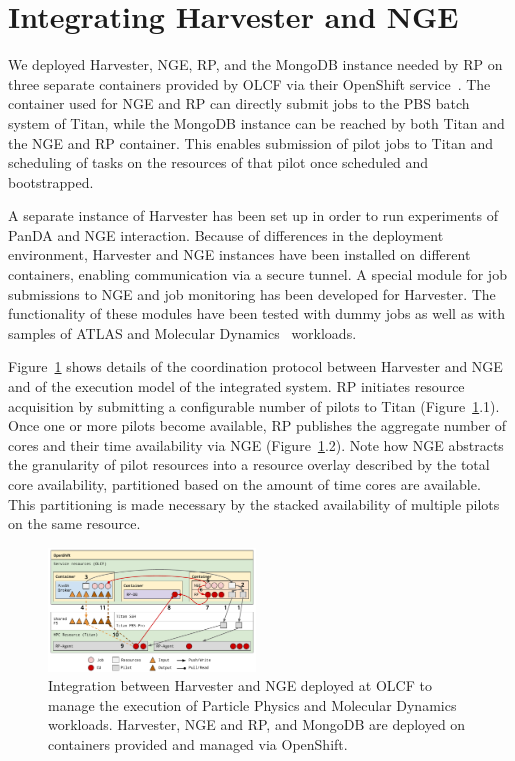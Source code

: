 \documentclass{webofc}
\begin{document}
\section{Integrating Harvester and NGE}\label{sec:integration}

We deployed Harvester, NGE, RP, and the MongoDB instance needed by RP on
three separate containers provided by OLCF via their OpenShift
service~\cite{openshift}. The container used for NGE and RP can directly
submit jobs to the PBS batch system of Titan, while the MongoDB instance can
be reached by both Titan and the NGE and RP container. This enables
submission of pilot jobs to Titan and scheduling of tasks on the resources of
that pilot once scheduled and bootstrapped.

A separate instance of Harvester has been set up in order to run experiments
of PanDA and NGE interaction. Because of differences in the deployment
environment, Harvester and NGE instances have been installed on different
containers, enabling communication via a secure tunnel. A special module for
job submissions to NGE and job monitoring has been developed for Harvester.
The functionality of these modules have been tested with dummy jobs as well
as with samples of ATLAS and Molecular Dynamics~\cite{Brooks2009CHARMMTB}
workloads.

Figure~\ref{fig:integration} shows details of the coordination protocol
between Harvester and NGE and of the execution model of the integrated
system. RP initiates resource acquisition by submitting a configurable number
of pilots to Titan (Figure~\ref{fig:integration}.1). Once one or more pilots
become available, RP publishes the aggregate number of cores and their time
availability via NGE (Figure~\ref{fig:integration}.2). Note how NGE abstracts
the granularity of pilot resources into a resource overlay described by the
total core availability, partitioned based on the amount of time cores are
available. This partitioning is made necessary by the stacked availability of
multiple pilots on the same resource.

\begin{figure}
  \centering
  \includegraphics[width=0.49\textwidth]{figures/integration.pdf}
  \caption{Integration between Harvester and NGE deployed at OLCF to manage
           the execution of Particle Physics and Molecular Dynamics
           workloads. Harvester, NGE and RP, and MongoDB are deployed on
           containers provided and managed via
           OpenShift.}\label{fig:integration}
\end{figure}
\end{document}
